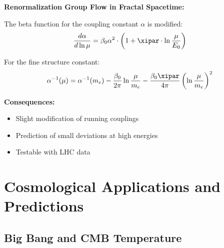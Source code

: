	\begin{relation}
		\textbf{Renormalization Group Flow in Fractal Spacetime:}
		
		The beta function for the coupling constant $\alpha$ is modified:
		\begin{equation}
			\frac{d\alpha}{d\ln\mu} = \beta_0 \alpha^2 \cdot \left(1 + \xipar \cdot \ln\frac{\mu}{E_0}\right)
		\end{equation}
		
		For the fine structure constant:
		\begin{equation}
			\alpha^{-1}(\mu) = \alpha^{-1}(m_e) - \frac{\beta_0}{2\pi} \ln\frac{\mu}{m_e} - \frac{\beta_0 \xipar}{4\pi} \left(\ln\frac{\mu}{m_e}\right)^2
		\end{equation}
		
		\textbf{Consequences:}
		\begin{itemize}
			\item Slight modification of running couplings
			\item Prediction of small deviations at high energies
			\item Testable with LHC data
		\end{itemize}
	\end{relation}
	
	\section{Cosmological Applications and Predictions}
	
	\subsection{Big Bang and CMB Temperature}
	
